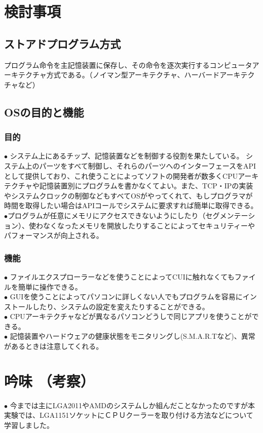 \documentclass[10pt]{article}
\begin{document}
\section{検討事項}
\subsection{ストアドプログラム方式}
\hspace{1cm} プログラム命令を主記憶装置に保存し、その命令を逐次実行するコンピュータアーキテクチャ方式である。（ノイマン型アーキテクチャ、ハーバードアーキテクチャなど）
\subsection{OSの目的と機能}
\subsubsection{目的}
$\bullet$ システム上にあるチップ、記憶装置などを制御する役割を果たしている。 システム上のパーツをすべて制御し、それらのパーツへのインターフェースをAPIとして提供しており、これ使うことによってソフトの開発者が数多くCPUアーキテクチャや記憶装置別にプログラムを書かなくてよい。また、TCP・IPの実装やシステムクロックの制御などもすべてOSがやってくれて、もしプログラマが時間を取得したい場合はAPIコールでシステムに要求すれば簡単に取得できる。\\
$\bullet$プログラムが任意にメモリにアクセスできないようにしたり（セグメンテーション）、使わなくなったメモリを開放したりすることによってセキュリティーやパフォーマンスが向上される。

\subsubsection{機能}
$\bullet$ ファイルエクスプローラーなどを使うことによってCUIに触れなくてもファイルを簡単に操作できる。\\
$\bullet$ GUIを使うことによってパソコンに詳しくない人でもプログラムを容易にインストールしたり、システムの設定を変えたりすることができる。\\
$\bullet$ CPUアーキテクチャなどが異なるパソコンどうしで同じアプリを使うことができる。\\
$\bullet$ 記憶装置やハードウェアの健康状態をモニタリングし(S.M.A.R.Tなど)、異常があるときは注意してくれる。

\section{吟味 （考察）}
$\bullet$ 今までは主にLGA2011やAMDのシステムしか組んだことなかったのですが本実験では、LGA1151ソケットにＣＰＵクーラーを取り付ける方法などについて学習しました。
\end{document}
